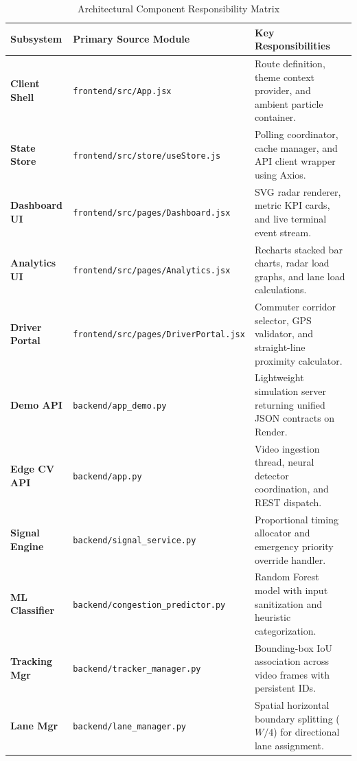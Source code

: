\documentclass[11pt,a4paper,oneside]{report}
\begin{document}
\begin{table}[h!]
\centering
\small
\begin{tabularx}{\textwidth}{l p{4.2cm} X}
\toprule
\textbf{Subsystem} & \textbf{Primary Source Module} & \textbf{Key Responsibilities} \\
\midrule
\textbf{Client Shell} & \texttt{frontend/src/App.jsx} & Route definition, theme context provider, and ambient particle container. \\
\textbf{State Store} & \texttt{frontend/src/store/useStore.js} & Polling coordinator, cache manager, and API client wrapper using Axios. \\
\textbf{Dashboard UI} & \texttt{frontend/src/pages/Dashboard.jsx} & SVG radar renderer, metric KPI cards, and live terminal event stream. \\
\textbf{Analytics UI} & \texttt{frontend/src/pages/Analytics.jsx} & Recharts stacked bar charts, radar load graphs, and lane load calculations. \\
\textbf{Driver Portal} & \texttt{frontend/src/pages/DriverPortal.jsx} & Commuter corridor selector, GPS validator, and straight-line proximity calculator. \\
\textbf{Demo API} & \texttt{backend/app\_demo.py} & Lightweight simulation server returning unified JSON contracts on Render. \\
\textbf{Edge CV API} & \texttt{backend/app.py} & Video ingestion thread, neural detector coordination, and REST dispatch. \\
\textbf{Signal Engine} & \texttt{backend/signal\_service.py} & Proportional timing allocator and emergency priority override handler. \\
\textbf{ML Classifier} & \texttt{backend/congestion\_predictor.py} & Random Forest model with input sanitization and heuristic categorization. \\
\textbf{Tracking Mgr} & \texttt{backend/tracker\_manager.py} & Bounding-box IoU association across video frames with persistent IDs. \\
\textbf{Lane Mgr} & \texttt{backend/lane\_manager.py} & Spatial horizontal boundary splitting ($W/4$) for directional lane assignment. \\
\bottomrule
\end{tabularx}
\caption{Architectural Component Responsibility Matrix}
\label{tab:comp_responsibility}
\end{table}
\end{document}
